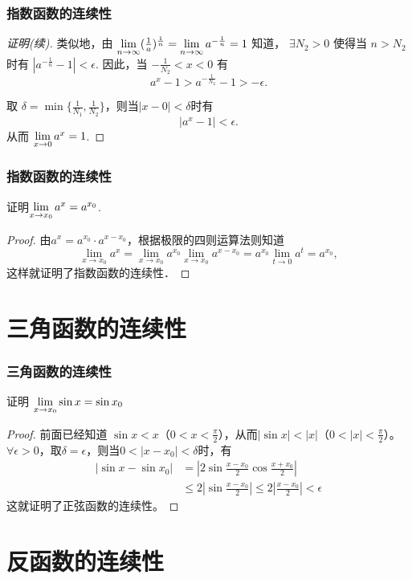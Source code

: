 \documentclass[14pt,notheorems,leqno,xcolor={rgb}]{beamer} %
\begin{document}
\begin{frame}
\frametitle{指数函数的连续性}
\begin{proof}[证明(续)]
类似地，由 $\lim\limits_{n\to\infty}(\frac1a)^{\frac1n}=\lim\limits_{n\to\infty}a^{-\frac1n}=1$ 知道，
$\exists N_2>0$ 使得当 $n>N_2$ 时有 $|a^{-\frac1n}-1|<\epsilon$. 
因此，当 $-\frac1{N_2}<x<0$ 有
\[a^x-1>a^{-\frac{1}{N_2}}-1>-\epsilon.\]
\par
取 $\delta=\min\{\frac1{N_1},\frac1{N_2}\}$，则当$|x-0|<\delta$时有
\[|a^x-1|<\epsilon.\]
从而 $\lim\limits_{x\to0}a^x=1$.
\end{proof}
\end{frame}

\begin{frame}
\frametitle{指数函数的连续性}
\begin{example*}
证明$\lim\limits_{x\to x_0}a^x= a^{x_0}$.
\end{example*}
\pause
\begin{proof}
由$a^x=a^{x_0}\cdot a^{x-x_0}$，根据极限的四则运算法则知道
\[\lim_{x\to x_0}a^x=\lim_{x\to x_0}a^{x_0}\lim_{x\to x_0}a^{x-x_0}=a^{x_0}\lim_{t\to 0}a^t=a^{x_0},\]
这样就证明了指数函数的连续性．
\end{proof}
\end{frame}

\section{三角函数的连续性}

\begin{frame}
\frametitle{三角函数的连续性}
\begin{example*}
证明 $\lim\limits_{x\to x_0}\sin x= \sin x_0$
\end{example*}
\pause
\begin{proof}
前面已经知道 $\sin x < x$（$0<x<\frac{\pi}{2}$），从而$|\sin x| < |x|$（$0<|x|<\frac{\pi}{2}$）。
\ppause
$\forall\epsilon>0$，取$\delta=\epsilon$，则当$0<|x-x_0|<\delta$时，有
\begin{align*}
  |\sin x - \sin x_0| &= \left| 2\sin\frac{x-x_0}2\cos\frac{x+x_0}{2} \right|\\
  &\le 2 \left| \sin\frac{x-x_0}2 \right| \le 2 \left| \frac{x-x_0}2 \right| < \epsilon
\end{align*}
这就证明了正弦函数的连续性。
\end{proof}
\end{frame}

\section{反函数的连续性}
\end{document}
